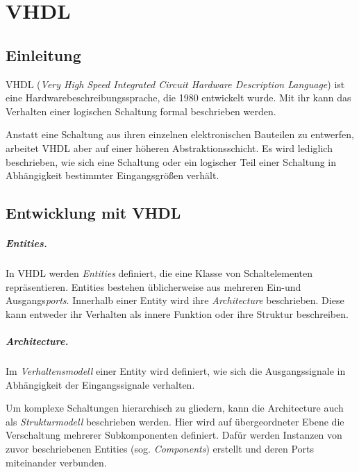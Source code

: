 \chapter{VHDL} %
\label{VHDL} %

\section{Einleitung}
VHDL (\textit{Very High Speed Integrated Circuit Hardware Description Language}) ist eine Hardwarebeschreibungssprache, die 1980 entwickelt wurde. Mit ihr kann das Verhalten einer logischen Schaltung formal beschrieben werden. \cite[S. 22f.]{kesel2013entwurf}

Anstatt eine Schaltung aus ihren einzelnen elektronischen Bauteilen zu entwerfen, arbeitet VHDL aber auf einer höheren Abstraktionsschicht. Es wird lediglich beschrieben, wie sich eine Schaltung oder ein logischer Teil einer Schaltung in Abhängigkeit bestimmter Eingangsgrößen verhält.

\section{Entwicklung mit VHDL}
\paragraph{Entities.} In VHDL werden \textit{Entities} definiert, die eine Klasse von Schaltelementen repräsentieren. Entities bestehen üblicherweise aus mehreren Ein-und Ausgangs\textit{ports}. Innerhalb einer Entity wird ihre \emph{Architecture} beschrieben. Diese kann entweder ihr Verhalten als innere Funktion oder ihre Struktur beschreiben.

\paragraph{Architecture.} Im \emph{Verhaltensmodell} einer Entity wird definiert, wie sich die Ausgangssignale in Abhängigkeit der Eingangssignale verhalten.

Um komplexe Schaltungen hierarchisch zu gliedern, kann die Architecture auch als \emph{Strukturmodell} beschrieben werden. Hier wird auf übergeordneter Ebene die Verschaltung mehrerer Subkomponenten definiert. Dafür werden Instanzen von zuvor beschriebenen Entities (sog. \textit{Components}) erstellt und deren Ports miteinander verbunden. \cite[S. 25ff.]{kesel2013entwurf}

